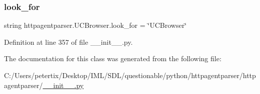 \subsubsection{\texorpdfstring{look\+\_\+for}{look\_for}}
{\footnotesize\ttfamily string httpagentparser.\+U\+C\+Browser.\+look\+\_\+for = \char`\"{}U\+C\+Browser\char`\"{}\hspace{0.3cm}{\ttfamily [static]}}



Definition at line 357 of file \+\_\+\+\_\+init\+\_\+\+\_\+.\+py.



The documentation for this class was generated from the following file\+:\begin{DoxyCompactItemize}
\item 
C\+:/\+Users/petertix/\+Desktop/\+I\+M\+L/\+S\+D\+L/questionable/python/httpagentparser/httpagentparser/\hyperlink{____init_____8py}{\+\_\+\+\_\+init\+\_\+\+\_\+.\+py}\end{DoxyCompactItemize}
